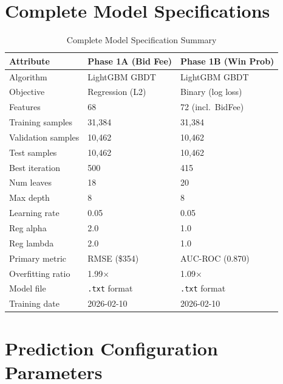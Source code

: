 \documentclass[12pt,a4paper]{article}
\begin{document}
\appendix
\section{Complete Model Specifications}

\begin{table}[H]
\centering
\caption{Complete Model Specification Summary}
\label{tab:model-specs}
\begin{tabular}{lll}
\toprule
\textbf{Attribute} & \textbf{Phase 1A (Bid Fee)} & \textbf{Phase 1B (Win Prob)} \\
\midrule
Algorithm & LightGBM GBDT & LightGBM GBDT \\
Objective & Regression (L2) & Binary (log loss) \\
Features & 68 & 72 (incl.\ BidFee) \\
Training samples & 31,384 & 31,384 \\
Validation samples & 10,462 & 10,462 \\
Test samples & 10,462 & 10,462 \\
Best iteration & 500 & 415 \\
Num leaves & 18 & 20 \\
Max depth & 8 & 8 \\
Learning rate & 0.05 & 0.05 \\
Reg alpha & 2.0 & 1.0 \\
Reg lambda & 2.0 & 1.0 \\
Primary metric & RMSE (\$354) & AUC-ROC (0.870) \\
Overfitting ratio & 1.99$\times$ & 1.09$\times$ \\
Model file & \texttt{.txt} format & \texttt{.txt} format \\
Training date & 2026-02-10 & 2026-02-10 \\
\bottomrule
\end{tabular}
\end{table}

\section{Prediction Configuration Parameters}
\end{document}
